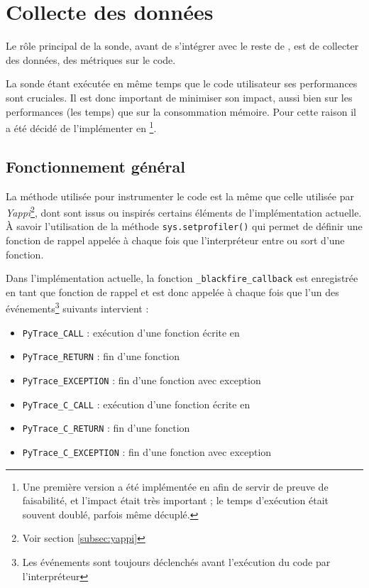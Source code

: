   
  \chapter[Collecte]{Collecte des données}
Le rôle principal de la sonde, avant de s'intégrer avec le reste de \Blackfire, est de collecter des données, des métriques sur le code.

La sonde étant exécutée en même temps que le code utilisateur ses performances sont cruciales. Il est donc important de minimiser son impact, aussi bien sur les performances (les temps) que sur la consommation mémoire. Pour cette raison il a été décidé de l'implémenter en \C\footnote{Une première version a été implémentée en \Python afin de servir de preuve de faisabilité, et l'impact était très important ; le temps d'exécution était souvent doublé, parfois même décuplé.}.

  \section{Fonctionnement général}
La méthode utilisée pour instrumenter le code \Python est la même que celle utilisée par \emph{Yappi}\footnote{Voir section \vref{subsec:yappi}}, dont sont issus ou inspirés certains éléments de l'implémentation actuelle. À savoir l'utilisation de la méthode \verb|sys.setprofiler()| qui permet de définir une fonction de rappel appelée à chaque fois que l'interpréteur entre ou sort d'une fonction.

Dans l'implémentation actuelle, la fonction \C \verb|_blackfire_callback| est enregistrée en tant que fonction de rappel et est donc appelée à chaque fois que l'un des événements\footnote{Les événements sont toujours déclenchés avant l'exécution du code par l'interpréteur} suivants intervient :
\begin{itemize}
\item \verb|PyTrace_CALL| : exécution d'une fonction écrite en \Python
\item \verb|PyTrace_RETURN| : fin d'une fonction \Python
\item \verb|PyTrace_EXCEPTION| : fin d'une fonction \Python avec exception
\item \verb|PyTrace_C_CALL| : exécution d'une fonction écrite en \C
\item \verb|PyTrace_C_RETURN| : fin d'une fonction \C
\item \verb|PyTrace_C_EXCEPTION| : fin d'une fonction \C avec exception
\end{itemize}

